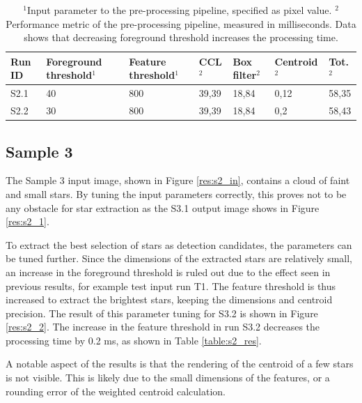 \documentclass[12pt]{report}
\begin{document}
\begin{table}[!h]
    \centering
    \begin{tabular}{|p{0.8cm}|p{2.5cm}|p{2cm}||p{1.25cm}|p{1.25cm}|p{1.9cm}|p{1cm}|}
        \hline
        \textbf{Run ID}&\textbf{Foreground threshold$^{1}$}&\textbf{Feature threshold$^{1}$}&\textbf{CCL$^{2}$}&\textbf{Box filter$^{2}$}&\textbf{Centroid$^{2}$}&\textbf{Tot.$^{2}$}\\
        \hline
        \hline
        S2.1&40&800&39,39&18,84&0,12&58,35\\
        \hline
        S2.2&30&800&39,39&18,84&0,2&58,43\\
        \hline
    \end{tabular}
    \caption{$^{1}$Input parameter to the pre-processing pipeline, specified as pixel value. $^{2}$Performance metric of the pre-processing pipeline, measured in milliseconds. Data shows that decreasing foreground threshold increases the processing time.}
    \label{table:s1_res}
\end{table}

\subsection*{Sample 3}
The Sample 3 input image, shown in Figure \ref{res:s2_in}, contains a cloud of faint and small stars. By tuning the input parameters correctly, this proves not to be any obstacle for star extraction as the S3.1 output image shows in Figure \ref{res:s2_1}.
\par
To extract the best selection of stars as detection candidates, the parameters can be tuned further. Since the dimensions of the extracted stars are relatively small, an increase in the foreground threshold is ruled out due to the effect seen in previous results, for example test input run T1. The feature threshold is thus increased to extract the brightest stars, keeping the dimensions and centroid precision. The result of this parameter tuning for S3.2 is shown in Figure \ref{res:s2_2}. The increase in the feature threshold in run S3.2 decreases the processing time by 0.2 ms, as shown in Table \ref{table:s2_res}.
\par
A notable aspect of the results is that the rendering of the centroid of a few stars is not visible. This is likely due to the small dimensions of the features, or a rounding error of the weighted centroid calculation.
\end{document}
